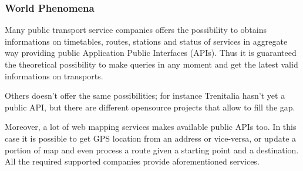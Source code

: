 \subsubsection{World Phenomena}

Many public transport service companies offers the possibility to obtains informations on timetables, routes, stations and status of services in aggregate way providing public Application Public Interfaces (APIs). Thus it is guaranteed the theoretical possibility to make queries in any moment and get the latest valid informations on transports.

Others doesn’t offer the same possibilities; for instance Trenitalia hasn’t yet a public API, but there are different opensource projects that allow to fill the gap.

Moreover, a lot of web mapping services makes available public APIs too. In this case it is possible to get GPS location from an address or vice-versa, or update a portion of map and even process a route given a starting point and a destination.
All the required supported companies provide aforementioned services.

